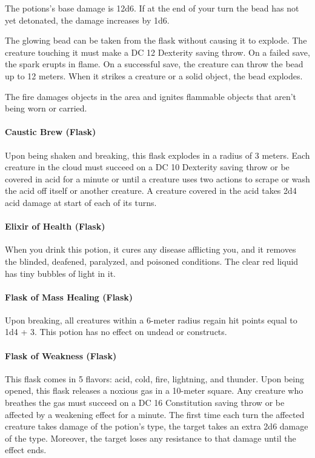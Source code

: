     The potions's base damage is 12d6.
    If at the end of your turn the bead has not yet detonated, the damage increases by 1d6.

    The glowing bead can be taken from the flask without causing it to explode.
    The creature touching it must make a DC 12 Dexterity saving throw.
    On a failed save, the spark erupts in flame.
    On a successful save, the creature can throw the bead up to 12 meters.
    When it strikes a creature or a solid object, the bead explodes.

    The fire damages objects in the area and ignites flammable objects that aren't being worn or carried.
\paragraph{Caustic Brew (Flask)} %
    Upon being shaken and breaking, this flask explodes in a radius of 3 meters.
    Each creature in the cloud must succeed on a DC 10 Dexterity saving throw or be covered in acid for a minute or until a creature uses two actions to scrape or wash the acid off itself or another creature.
    A creature covered in the acid takes 2d4 acid damage at start of each of its turns.
\paragraph{Elixir of Health (Flask)}
    When you drink this potion, it cures any disease afflicting you, and it removes the blinded, deafened, paralyzed, and poisoned conditions.
    The clear red liquid has tiny bubbles of light in it.
\paragraph{Flask of Mass Healing (Flask)} %
    Upon breaking, all creatures within a 6-meter radius regain hit points equal to 1d4 + 3.
    This potion has no effect on undead or constructs.
\paragraph{Flask of Weakness (Flask)} %
    This flask comes in 5 flavors: acid, cold, fire, lightning, and thunder.
    Upon being opened, this flask releases a noxious gas in a 10-meter square.
    Any creature who breathes the gas must succeed on a DC 16 Constitution saving throw or be affected by a weakening effect for a minute.
    The first time each turn the affected creature takes damage of the potion's type, the target takes an extra 2d6 damage of the type.
    Moreover, the target loses any resistance to that damage until the effect ends.
